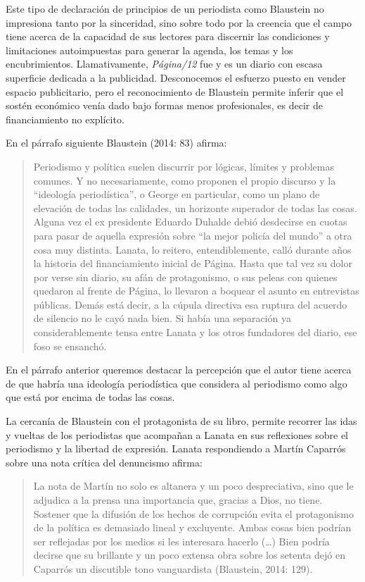 Este tipo de declaración de principios de un periodista como Blaustein no impresiona tanto por la sinceridad, sino sobre todo por la creencia que el campo tiene acerca de la capacidad de sus lectores para discernir las condiciones y limitaciones autoimpuestas para generar la agenda, los temas y los encubrimientos. Llamativamente, \emph{Página/12} fue y es un diario con escasa superficie dedicada a la publicidad. Desconocemos el esfuerzo puesto en vender espacio publicitario, pero el reconocimiento de Blaustein permite inferir que el sostén económico venía dado bajo formas menos profesionales, es decir de financiamiento no explícito.

En el párrafo siguiente Blaustein (2014: 83) afirma:

\begin{quote}
Periodismo y política suelen discurrir por lógicas, límites y problemas comunes. Y no necesariamente, como proponen el propio discurso y la \enquote{ideología periodística}, o George en particular, como un plano de elevación de todas las calidades, un horizonte superador de todas las cosas. Alguna vez el ex presidente Eduardo Duhalde debió desdecirse en cuotas para pasar de aquella expresión sobre \enquote{la mejor policía del mundo} a otra cosa muy distinta. Lanata, lo reitero, entendiblemente, calló durante años la historia del financiamiento inicial de Página. Hasta que tal vez su dolor por verse sin diario, su afán de protagonismo, o sus peleas con quienes quedaron al frente de Página, lo llevaron a boquear el asunto en entrevistas públicas. Demás está decir, a la cúpula directiva esa ruptura del acuerdo de silencio no le cayó nada bien. Si había una separación ya considerablemente tensa entre Lanata y los otros fundadores del diario, ese foso se ensanchó.
\end{quote}

En el párrafo anterior queremos destacar la percepción que el autor tiene acerca de que habría una ideología periodística que considera al periodismo como algo que está por encima de todas las cosas.

La cercanía de Blaustein con el protagonista de su libro, permite recorrer las idas y vueltas de los periodistas que acompañan a Lanata en sus reflexiones sobre el periodismo y la libertad de expresión. Lanata respondiendo a Martín Caparrós sobre una nota crítica del denuncismo afirma:

\begin{quote}
La nota de Martín no solo es altanera y un poco despreciativa, sino que le adjudica a la prensa una importancia que, gracias a Dios, no tiene. Sostener que la difusión de los hechos de corrupción evita el protagonismo de la política es demasiado lineal y excluyente. Ambas cosas bien podrían ser reflejadas por los medios si les interesara hacerlo (\ldots) Bien podría decirse que su brillante y un poco extensa obra sobre los setenta dejó en Caparrós un discutible tono vanguardista (Blaustein, 2014: 129).
\end{quote}

